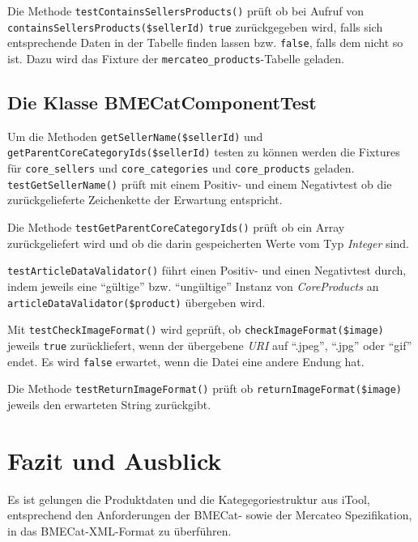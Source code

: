 {	Die Methode \texttt{testContainsSellersProducts()} prüft ob bei Aufruf von \texttt{containsSellersProducts\-(\$sellerId)} \texttt{true} zurückgegeben wird, falls sich entsprechende Daten in der Tabelle finden lassen bzw. \texttt{false}, falls dem nicht so ist. Dazu wird das Fixture der \texttt{mercateo\_products}-Tabelle geladen.
	
	\subsection{Die Klasse BMECatComponentTest}
	
	Um die Methoden \texttt{getSellerName(\$sellerId)} und \texttt{getParentCoreCategoryIds(\$sellerId)} testen zu können werden die Fixtures für \texttt{core\_sellers} und \texttt{core\_categories} und \texttt{core\_products} geladen.
	\texttt{testGetSellerName()} prüft mit einem Positiv- und einem Negativtest ob die zurückgelieferte Zeichenkette der Erwartung entspricht.
	
	Die Methode \texttt{testGetParentCoreCategoryIds()} prüft ob ein Array zurückgeliefert wird und ob die darin gespeicherten Werte vom Typ \textit{Integer} sind.
	
	\texttt{testArticleDataValidator()} führt einen Positiv- und einen Negativtest durch, indem jeweils eine \enquote{gültige} bzw. \enquote{ungültige} Instanz von \textit{CoreProducts} an \texttt{articleDataValidator(\$product)} übergeben wird.
	
	Mit \texttt{testCheckImageFormat()} wird geprüft, ob \texttt{checkImageFormat(\$image)} jeweils \texttt{true} zurückliefert, wenn der übergebene \textit{URI} auf \enquote{.jpeg}, \enquote{.jpg} oder \enquote{gif} endet. Es wird \texttt{false} erwartet, wenn die Datei eine andere Endung hat.
	
	Die Methode \texttt{testReturnImageFormat()} prüft ob \texttt{returnImageFormat(\$image)} jeweils den erwarteten String zurückgibt.
	
	\section{Fazit und Ausblick}
	
	Es ist gelungen die Produktdaten und die Kategegoriestruktur aus iTool, entsprechend den Anforderungen der BMECat- sowie der Mercateo Spezifikation, in das BMECat-XML-Format zu überführen. 
	
}
